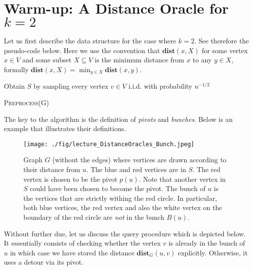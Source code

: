 \section{Warm-up: A Distance Oracle for $k=2$}

Let us first describe the data structure for the case where $k=2$. See therefore the pseudo-code below. Here we use the convention that $\mathbf{dist}(x,X)$ for some vertex $x \in V$ and some subset $X \subseteq V$ is the minimum distance from $x$ to any $y \in X$, formally $\mathbf{dist}(x,X) = \min_{y \in X} \mathbf{dist}(x,y)$.

\begin{algorithm}
  \SetAlgoLined
  Obtain $S$ by sampling every vertex $v \in V$ i.i.d. with probability $n^{-1/2}$\;
  
  \caption{\textsc{Preprocess}(G)}
\end{algorithm}

The key to the algorithm is the definition of \emph{pivots} and \emph{bunches}. Below is an example that illustrates their definitions.

\begin{figure}[!ht]
    \centering
    \texttt{[image: ./fig/lecture\_DistanceOracles\_Bunch.jpeg]}
    \caption{Graph $G$ (without the edges) where vertices are drawn according to their distance from $u$. The blue and red vertices are in $S$. The red vertex is chosen to be the pivot $p(u)$. Note that another vertex in $S$ could have been chosen to become the pivot. The bunch of $u$ is the vertices that are strictly withing the red circle. In particular, both blue vertices, the red vertex and also the white vertex on the boundary of the red circle are \emph{not} in the bunch $B(u)$.}
\end{figure}

Without further due, let us discuss the query procedure which is depicted below. It essentially consists of checking whether the vertex $v$ is already in the bunch of $u$ in which case we have stored the distance $\mathbf{dist}_G(u,v)$ explicitly. Otherwise, it uses a detour via its pivot.

